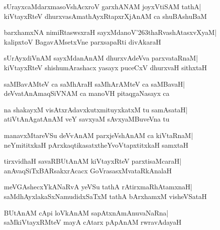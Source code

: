 \documentclass[twoside,12pt,openright]{book}
\def\S{\char'263}
\newcounter{shloka}[chapter]
\begin{document}
\begin{shloka}%
sUrayxcaMdarxmasoVshAcxroV garxhANAM joyxVtiSAM tathA|\\
kiVtayxRteV dhurxvasAmathAyxRtapxrXjAnAM ca shuBAshuBaM
\end{shloka}

\begin{shloka}%
barxhamxNA nimiRtaswsxraH sayxMdanoV\S thaRvashAtasxvXyaM|\\
kalipxtoV BagavAMsetxVne parxsapaRti divAkaraH
\end{shloka}

\begin{shloka}%
sUrAyxdiVnAM sayxMdanAnAM dhurxvAdeVva parxvataRnaM|\\
kiVtayxRteV shishumArashacx yasayx puceCxV dhurxvaH sithxtaH
\end{shloka}

\begin{shloka}%
saMBavAMteV ca saMhAraH saMhArAMteV ca saMBavaH|\\
deVvatAnAmaqSiVNAM ca manoVH pitaqgaNasayx ca
\end{shloka}

\begin{shloka}%
na shakayxM visAtxrAdavxkutxmituyxkatxM tu samAsataH|\\
atiVtAnAgatAnAM veY savxyaM sAvxyaMBuveVna tu
\end{shloka}

\begin{shloka}%
manavxMtareVSu deVvAnAM parxjeVshAnAM ca kiVtaRnaM|\\
neYmititxkaH pArxkaqtikasatxtheYvoVtapxtitxkaH samxtaH
\end{shloka}

\begin{shloka}%
tirxvidhaH savaRBUtAnAM kiVtayxRteV parxtisaMcaraH|\\
anAvaqSiTxBARsakxrAcacx GoVrasasxMvataRkAnalaH
\end{shloka}

\begin{shloka}%
meVGAshecxYkANaRvA yeVSu tathA rAtirxmaRhAtamxnaH|\\
saMdhAyxlakaSxNamudidxSaTxM tathA bArxhamxM visheVSataH
\end{shloka}

\begin{shloka}%
BUtAnAM cApi loVkAnAM sapAtxnAmAnuvaNaRna|\\
saMkiVtayxRMteV mayA cAtarx pApAnAM rwravAdayaH
\end{shloka}
\end{document}
